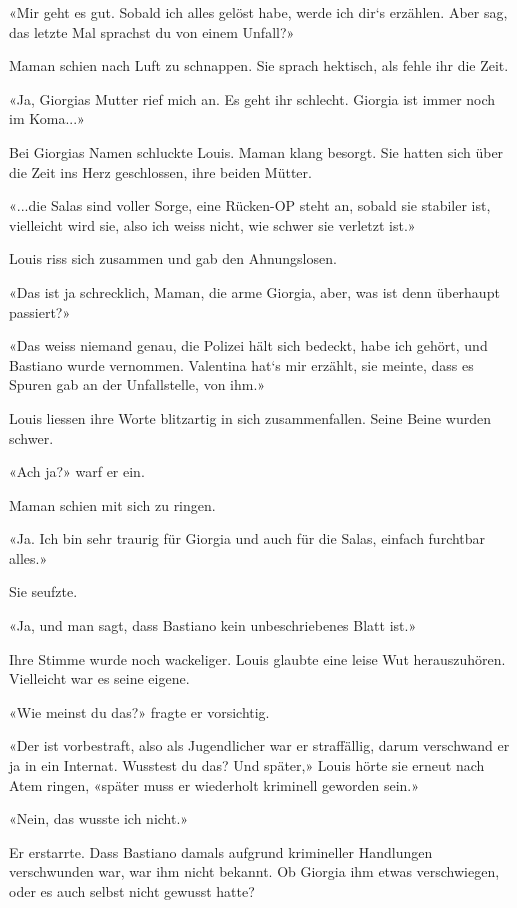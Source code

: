 «Mir geht es gut. Sobald ich alles gelöst habe, werde ich dir`s
erzählen. Aber sag, das letzte Mal sprachst du von einem Unfall?»

Maman schien nach Luft zu schnappen. Sie sprach hektisch, als fehle ihr
die Zeit.

«Ja, Giorgias Mutter rief mich an. Es geht ihr schlecht. Giorgia ist
immer noch im Koma...»

Bei Giorgias Namen schluckte Louis. Maman klang besorgt. Sie hatten sich
über die Zeit ins Herz geschlossen, ihre beiden Mütter.

«...die Salas sind voller Sorge, eine Rücken-OP steht an, sobald sie
stabiler ist, vielleicht wird sie, also ich weiss nicht, wie schwer sie
verletzt ist.»

Louis riss sich zusammen und gab den Ahnungslosen.

«Das ist ja schrecklich, Maman, die arme Giorgia, aber, was ist denn
überhaupt passiert?»

«Das weiss niemand genau, die Polizei hält sich bedeckt, habe ich
gehört, und Bastiano wurde vernommen. Valentina hat`s mir erzählt, sie
meinte, dass es Spuren gab an der Unfallstelle, von ihm.»

Louis liessen ihre Worte blitzartig in sich zusammenfallen. Seine Beine
wurden schwer.

«Ach ja?» warf er ein.

Maman schien mit sich zu ringen.

«Ja. Ich bin sehr traurig für Giorgia und auch für die Salas, einfach
furchtbar alles.»

Sie seufzte.

«Ja, und man sagt, dass Bastiano kein unbeschriebenes Blatt ist.»

Ihre Stimme wurde noch wackeliger. Louis glaubte eine leise Wut
herauszuhören. Vielleicht war es seine eigene.

«Wie meinst du das?» fragte er vorsichtig.

«Der ist vorbestraft, also als Jugendlicher war er straffällig, darum
verschwand er ja in ein Internat. Wusstest du das? Und später,» Louis
hörte sie erneut nach Atem ringen, «später muss er wiederholt kriminell
geworden sein.»

«Nein, das wusste ich nicht.»

Er erstarrte. Dass Bastiano damals aufgrund krimineller Handlungen
verschwunden war, war ihm nicht bekannt. Ob Giorgia ihm etwas
verschwiegen, oder es auch selbst nicht gewusst hatte?

